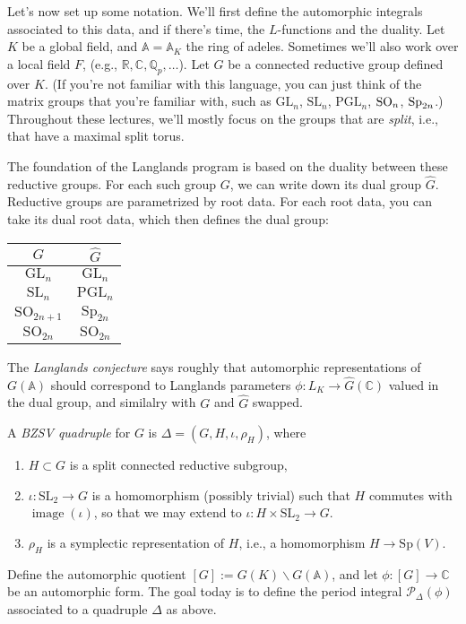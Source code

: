 \documentclass[reqno]{amsart} 
\begin{document}
Let's now set up some notation.  We'll first define the automorphic integrals associated to this data, and if there's time, the $L$-functions and the duality.  Let $K$ be a global field, and $\mathbb{A} = \mathbb{A}_K$ the ring of adeles.  Sometimes we'll also work over a local field $F$, (e.g., $\mathbb{R}, \mathbb{C}, \mathbb{Q}_p, \dotsc$).  Let $G$ be a connected reductive group defined over $K$.  (If you're not familiar with this language, you can just think of the matrix groups that you're familiar with, such as $\mathrm{GL}_n$, $\mathrm{SL}_n$, $\mathrm{PGL}_n$, $\operatorname{SO}_n$, $\operatorname{Sp}_{2 n}$.)  Throughout these lectures, we'll mostly focus on the groups that are \emph{split}, i.e., that have a maximal split torus.

The foundation of the Langlands program is based on the duality between these reductive groups.  For each such group $G$, we can write down its dual group $\hat{G}$.  Reductive groups are parametrized by root data.  For each root data, you can take its dual root data, which then defines the dual group:
\begin{tabular}{|c|c|}
  \hline
  $G$ & $\hat{G}$ \\
  \hline \hline
  $\mathrm{GL}_n$ & $\mathrm{GL}_n$ \\
  \hline
  $\mathrm{SL}_n$ & $\mathrm{PGL}_n$ \\
  \hline
  $\mathrm{SO}_{2n+1}$ & $\mathrm{Sp}_{2n}$ \\
  \hline
  $\mathrm{SO}_{2n}$ & $\mathrm{SO}_{2n}$ \\
  \hline
\end{tabular}

The \emph{Langlands conjecture} says roughly that automorphic representations of $G(\mathbb{A})$ should correspond to Langlands parameters $\phi : L_K \rightarrow \hat{G}(\mathbb{C})$ valued in the dual group, and similalry with $G$ and $\hat{G}$ swapped.

\begin{definition}\label{definition:cq6tho3qgh}
  A \emph{BZSV quadruple} for $G$ is $\Delta =(G, H, \iota, \rho_H)$, where
  \begin{enumerate}
  \item\label{enumerate:cq6tg8um5h} $H \subset G$ is a split connected reductive subgroup,
  \item\label{enumerate:cq6tg8uyi6} $\iota : \mathrm{SL}_2 \rightarrow G$ is a homomorphism (possibly trivial) such that $H$ commutes with $\operatorname{image}(\iota)$, so that we may extend to $\iota : H \times \mathrm{SL}_2 \rightarrow G$.
  \item\label{enumerate:cq6tg8wpyk} $\rho_H$ is a symplectic representation of $H$, i.e., a homomorphism $H \rightarrow \mathrm{Sp}(V)$.
  \end{enumerate}
\end{definition}
Define the automorphic quotient $[G] := G(K) \backslash G(\mathbb{A})$, and let $\phi :[G] \rightarrow \mathbb{C}$ be an automorphic form.  The goal today is to define the period integral $\mathcal{P}_\Delta(\phi)$ associated to a quadruple $\Delta$ as above.
\end{document}
